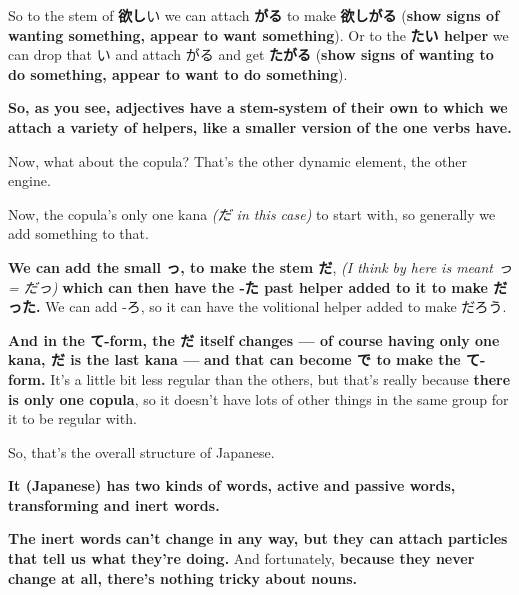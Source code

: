 {}

So to the stem of {\bf 欲し}い we can attach {\bf がる} to make {\bf 欲しがる} ({\bf show signs of wanting something, appear to want something}). Or to the {\bf たい helper} we can drop that い and attach がる and get {\bf たがる} ({\bf show signs of wanting to do something, appear to want to do something}).

{}

\thinrule

{\bf So, as you see, adjectives have a stem-system of their own to which we attach a variety of helpers, like a smaller version of the one verbs have.}

\stopsectionlevel

\stopsectionlevel

\startsectionlevel[title={The Copula},reference={the-copula}]

Now, what about the copula? That's the other dynamic element, the other engine.

{}

Now, the copula's only one kana {\em (だ in this case)} to start with, so generally we add something to that.

{\bf We can add the small っ, to make the stem だ}, {\em (I think by  here is meant っ = だっ)} {\bf which can then have the -た past helper added to it to make だった.} We can add -ろ, so it can have the volitional helper added to make だろう.

{\bf And in the て-form, the だ itself changes --- of course having only one kana, だ is the last kana --- } {\bf and that can become で to make the て-form.} It's a little bit less regular than the others, but that's really because {\bf there is only one copula}, so it doesn't have lots of other things in the same group for it to be regular with.

\stopsectionlevel

\startsectionlevel[title={Summary},reference={summary}]

So, that's the overall structure of Japanese.

{}

{\bf It (Japanese) has two kinds of words, active and passive words, transforming and inert words.}

{\bf The inert words} {\bf can't change in any way, but they can attach particles that tell us what they're doing.} And fortunately, {\bf because they never change at all, there's nothing tricky about nouns.}


